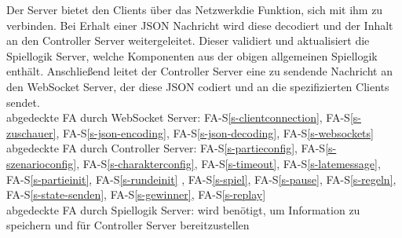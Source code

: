 Der Server bietet den Clients über das \glqq Netzwerk\grqq die Funktion, sich mit ihm zu verbinden. Bei Erhalt einer JSON Nachricht wird diese decodiert und der Inhalt an den Controller Server weitergeleitet. Dieser validiert und aktualisiert die Spiellogik Server, welche Komponenten aus der obigen allgemeinen Spiellogik enthält. Anschließend leitet der Controller Server eine zu sendende Nachricht an den WebSocket Server, der diese JSON codiert und an die spezifizierten Clients sendet.\\ 
abgedeckte FA durch WebSocket Server: FA-S\ref{s-clientconnection}, FA-S\ref{s-zuschauer},  FA-S\ref{s-json-encoding}, FA-S\ref{s-json-decoding}, FA-S\ref{s-websockets}\\
abgedeckte FA durch Controller Server: FA-S\ref{s-partieconfig}, FA-S\ref{s-szenarioconfig}, FA-S\ref{s-charakterconfig}, FA-S\ref{s-timeout}, FA-S\ref{s-latemessage}, FA-S\ref{s-partieinit}, FA-S\ref{s-rundeinit} , FA-S\ref{s-spiel}, FA-S\ref{s-pause}, FA-S\ref{s-regeln}, FA-S\ref{s-state-senden}, FA-S\ref{s-gewinner},  FA-S\ref{s-replay}\\
abgedeckte FA durch Spiellogik Server: wird benötigt, um Information zu speichern und für Controller Server bereitzustellen\\

